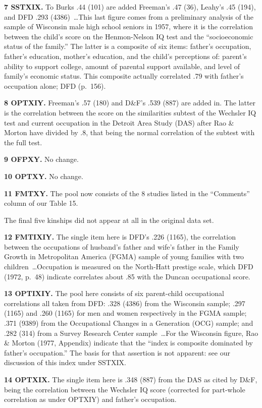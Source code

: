 ﻿\documentclass[12pt]{article}
\begin{document}
\textbf{7 SSTXIX.} To Burks .44 (101) are added Freeman's .47 (36), Leahy's .45 (194), and DFD .293 (4386)~\ldots This last figure comes from a preliminary analysis of the sample of Wisconsin male high school seniors in 1957, where it is the correlation between the child's score on the Henmon-Nelson IQ test and the ``socioeconomic status of the family.'' The latter is a composite of six items: father's occupation, father's education, mother's education, and the child's perceptions of: parent's ability to support college, amount of parental support available, and level of family's economic status. This composite actually correlated .79 with father's occupation alone; DFD (p.\ 156).

\textbf{8 OPTXIY.} Freeman's .57 (180) and D\&F's .539 (887) are added in. The latter is the correlation between the score on the similarities subtest of the Wechsler IQ test and current occupation in the Detroit Area Study (DAS) after Rao \& Morton have divided by .8, that being the normal correlation of the subtest with the full test.

\textbf{9 OFPXY.} No change.

\textbf{10 OPTXY.} No change.

\textbf{11 FMTXY.} The pool now consists of the 8 studies listed in the ``Comments'' column of our Table 15.

The final five kinships did not appear at all in the original data set.

\textbf{12 FMTIXIY.} The single item here is DFD's .226 (1165), the correlation between the occupations of husband's father and wife's father in the Family Growth in Metropolitan America (FGMA) sample of young families with two children~\ldots Occupation is measured on the North-Hatt prestige scale, which DFD (1972, p.\ 48) indicate correlates about .85 with the Duncan occupational score.

\textbf{13 OPTIXIY.} The pool here consists of six parent-child occupational correlations all taken from DFD: .328 (4386) from the Wisconsin sample; .297 (1165) and .260 (1165) for men and women respectively in the FGMA sample; .371 (9389) from the Occupational Changes in a Generation (OCG) sample; and .282 (314) from a Survey Research Center sample~\ldots For the Wisconsin figure, Rao \& Morton (1977, Appendix) indicate that the ``index is composite dominated by father's occupation.'' The basis for that assertion is not apparent: see our discussion of this index under SSTXIX.

\textbf{14 OPTXIX.} The single item here is .348 (887) from the DAS as cited by D\&F, being the correlation between the Wechsler IQ score (corrected for part-whole correlation as under OPTXIY) and father's occupation.
\end{document}
